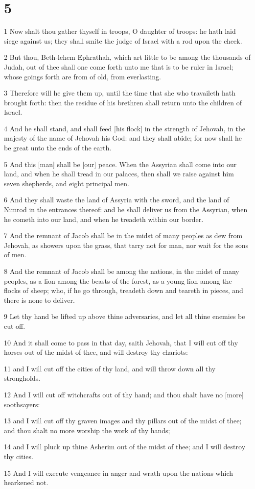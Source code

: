 \chapter{5}

\par 1 Now shalt thou gather thyself in troops, O daughter of troops: he hath laid siege against us; they shall smite the judge of Israel with a rod upon the cheek.
\par 2 But thou, Beth-lehem Ephrathah, which art little to be among the thousands of Judah, out of thee shall one come forth unto me that is to be ruler in Israel; whose goings forth are from of old, from everlasting.
\par 3 Therefore will he give them up, until the time that she who travaileth hath brought forth: then the residue of his brethren shall return unto the children of Israel.
\par 4 And he shall stand, and shall feed [his flock] in the strength of Jehovah, in the majesty of the name of Jehovah his God: and they shall abide; for now shall he be great unto the ends of the earth.
\par 5 And this [man] shall be [our] peace. When the Assyrian shall come into our land, and when he shall tread in our palaces, then shall we raise against him seven shepherds, and eight principal men.
\par 6 And they shall waste the land of Assyria with the sword, and the land of Nimrod in the entrances thereof: and he shall deliver us from the Assyrian, when he cometh into our land, and when he treadeth within our border.
\par 7 And the remnant of Jacob shall be in the midst of many peoples as dew from Jehovah, as showers upon the grass, that tarry not for man, nor wait for the sons of men.
\par 8 And the remnant of Jacob shall be among the nations, in the midst of many peoples, as a lion among the beasts of the forest, as a young lion among the flocks of sheep; who, if he go through, treadeth down and teareth in pieces, and there is none to deliver.
\par 9 Let thy hand be lifted up above thine adversaries, and let all thine enemies be cut off.
\par 10 And it shall come to pass in that day, saith Jehovah, that I will cut off thy horses out of the midst of thee, and will destroy thy chariots:
\par 11 and I will cut off the cities of thy land, and will throw down all thy strongholds.
\par 12 And I will cut off witchcrafts out of thy hand; and thou shalt have no [more] soothsayers:
\par 13 and I will cut off thy graven images and thy pillars out of the midst of thee; and thou shalt no more worship the work of thy hands;
\par 14 and I will pluck up thine Asherim out of the midst of thee; and I will destroy thy cities.
\par 15 And I will execute vengeance in anger and wrath upon the nations which hearkened not.

